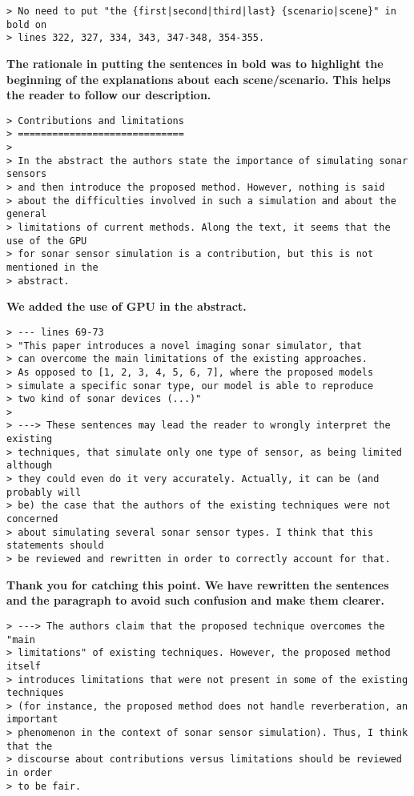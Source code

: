 \documentclass{article}
\begin{document}
\begin{verbatim}
> No need to put "the {first|second|third|last} {scenario|scene}" in bold on
> lines 322, 327, 334, 343, 347-348, 354-355.
\end{verbatim}

\textbf{The rationale in putting the sentences in bold was to highlight the beginning
of the explanations about each scene/scenario. This helps the reader to follow our
description.}

\begin{verbatim}
> Contributions and limitations
> =============================
>
> In the abstract the authors state the importance of simulating sonar sensors
> and then introduce the proposed method. However, nothing is said
> about the difficulties involved in such a simulation and about the general
> limitations of current methods. Along the text, it seems that the use of the GPU
> for sonar sensor simulation is a contribution, but this is not mentioned in the
> abstract.
\end{verbatim}

\textbf{We added the use of GPU in the abstract.}


\begin{verbatim}
> --- lines 69-73
> "This paper introduces a novel imaging sonar simulator, that
> can overcome the main limitations of the existing approaches.
> As opposed to [1, 2, 3, 4, 5, 6, 7], where the proposed models
> simulate a specific sonar type, our model is able to reproduce
> two kind of sonar devices (...)"
>
> ---> These sentences may lead the reader to wrongly interpret the existing
> techniques, that simulate only one type of sensor, as being limited although
> they could even do it very accurately. Actually, it can be (and probably will
> be) the case that the authors of the existing techniques were not concerned
> about simulating several sonar sensor types. I think that this statements should
> be reviewed and rewritten in order to correctly account for that.
\end{verbatim}

\textbf{Thank you for catching this point. We have rewritten the sentences
and the paragraph to avoid such confusion and make them clearer.}

\begin{verbatim}
> ---> The authors claim that the proposed technique overcomes the "main
> limitations" of existing techniques. However, the proposed method itself
> introduces limitations that were not present in some of the existing techniques
> (for instance, the proposed method does not handle reverberation, an important
> phenomenon in the context of sonar sensor simulation). Thus, I think that the
> discourse about contributions versus limitations should be reviewed in order
> to be fair.
\end{verbatim}
\end{document}

